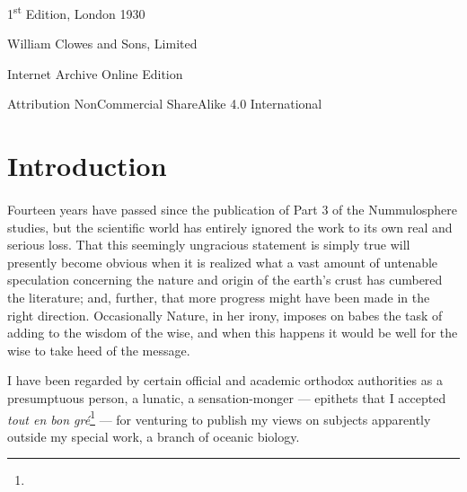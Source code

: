 \documentclass[a4paper, 12pt, oneside]{article}
\begin{document}
\begin{titlepage}
	
	
		
	\vspace*{\fill}%
	
	1\textsuperscript{st} Edition, London 1930 %
	
	{\small William Clowes and Sons, Limited } %

	\vspace{1\baselineskip} %

    Internet Archive Online Edition  %
	
	{\small Attribution NonCommercial ShareAlike 4.0 International } %
\end{titlepage}
\setlength{\parskip}{1mm plus1mm minus1mm}
\setcounter{tocdepth}{3}
\setcounter{secnumdepth}{3}
\pagestyle{fancy}
\fancyhf{}
\cfoot{\Fontauri{\thepage}}
\tableofcontents
\clearpage
\listoffigures{}
\clearpage
\Large
\section*{Introduction}
\paragraph{}
Fourteen years have passed since the publication of Part 3 of the Nummulosphere studies, but the scientific world has entirely ignored the work to its own real and serious loss. That this seemingly ungracious statement is simply true will presently become obvious when it is realized what a vast amount of untenable speculation concerning the nature and origin of the earth's crust has cumbered the literature; and, further, that more progress might have been made in the right direction. Occasionally Nature, in her irony, imposes on babes the task of adding to the wisdom of the wise, and when this happens it would be well for the wise to take heed of the message.

I have been regarded by certain official and academic orthodox authorities as a presumptuous person, a lunatic, a sensation-monger --- epithets that I accepted \emph{tout en bon gré}\footnote{} --- for venturing to publish my views on subjects apparently outside my special work, a branch of oceanic biology.
\end{document}
